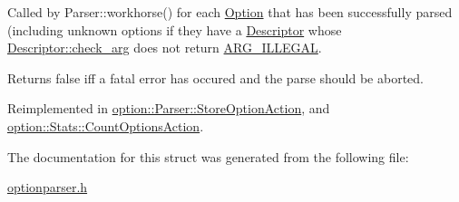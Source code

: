 Called by Parser\+::workhorse() for each \hyperlink{classoption_1_1_option}{Option} that has been successfully parsed (including unknown options if they have a \hyperlink{structoption_1_1_descriptor}{Descriptor} whose \hyperlink{structoption_1_1_descriptor_aa5d675dba0214a4abd73007ff163cc67}{Descriptor\+::check\+\_\+arg} does not return \hyperlink{namespaceoption_aee8c76a07877335762631491e7a5a1a9a9528e32563b795bd2930b12d0a5e382d}{A\+R\+G\+\_\+\+I\+L\+L\+E\+G\+AL}. 

Returns {\ttfamily false} iff a fatal error has occured and the parse should be aborted. 

Reimplemented in \hyperlink{classoption_1_1_parser_1_1_store_option_action_a8931919fba5516377c202920db2b2f84}{option\+::\+Parser\+::\+Store\+Option\+Action}, and \hyperlink{classoption_1_1_stats_1_1_count_options_action_a29ab8a68d0a30736b99b4d2e5dece489}{option\+::\+Stats\+::\+Count\+Options\+Action}.



The documentation for this struct was generated from the following file\+:\begin{DoxyCompactItemize}
\item 
\hyperlink{optionparser_8h}{optionparser.\+h}\end{DoxyCompactItemize}
